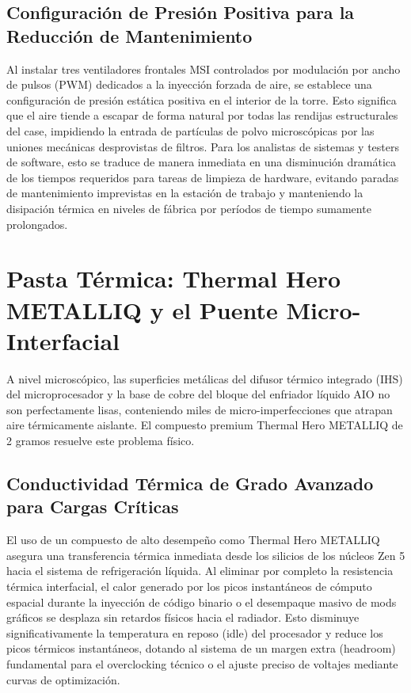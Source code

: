 \documentclass[12pt,a4paper]{article}
\begin{document}
\subsection{Configuración de Presión Positiva para la Reducción de Mantenimiento}
Al instalar tres ventiladores frontales MSI controlados por modulación por ancho de pulsos (PWM) dedicados a la inyección forzada de aire, se establece una configuración de presión estática positiva en el interior de la torre. Esto significa que el aire tiende a escapar de forma natural por todas las rendijas estructurales del case, impidiendo la entrada de partículas de polvo microscópicas por las uniones mecánicas desprovistas de filtros. Para los analistas de sistemas y testers de software, esto se traduce de manera inmediata en una disminución dramática de los tiempos requeridos para tareas de limpieza de hardware, evitando paradas de mantenimiento imprevistas en la estación de trabajo y manteniendo la disipación térmica en niveles de fábrica por períodos de tiempo sumamente prolongados.

\newpage

\section{Pasta Térmica: Thermal Hero METALLIQ y el Puente Micro-Interfacial}

A nivel microscópico, las superficies metálicas del difusor térmico integrado (IHS) del microprocesador y la base de cobre del bloque del enfriador líquido AIO no son perfectamente lisas, conteniendo miles de micro-imperfecciones que atrapan aire térmicamente aislante. El compuesto premium Thermal Hero METALLIQ de 2 gramos resuelve este problema físico.

\subsection{Conductividad Térmica de Grado Avanzado para Cargas Críticas}
El uso de un compuesto de alto desempeño como Thermal Hero METALLIQ asegura una transferencia térmica inmediata desde los silicios de los núcleos Zen 5 hacia el sistema de refrigeración líquida. Al eliminar por completo la resistencia térmica interfacial, el calor generado por los picos instantáneos de cómputo espacial durante la inyección de código binario o el desempaque masivo de mods gráficos se desplaza sin retardos físicos hacia el radiador. Esto disminuye significativamente la temperatura en reposo (idle) del procesador y reduce los picos térmicos instantáneos, dotando al sistema de un margen extra (headroom) fundamental para el overclocking técnico o el ajuste preciso de voltajes mediante curvas de optimización.
\end{document}
